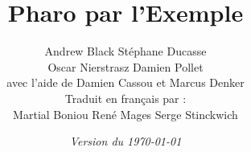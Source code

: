 \documentclass[a4paper,10pt,twoside]{book}
\begin{document}
\frontmatter
\setcounter{page}{1}
\pagestyle{headings}
\author{
	Andrew Black\quad
	St\'ephane Ducasse\\[1ex]
	Oscar Nierstrasz\quad
	Damien Pollet
	\\[4ex]
	avec l'aide de Damien Cassou et Marcus Denker
	\\[4ex]
Traduit en fran\c{c}ais par :\\[2ex]
Martial Boniou\quad
René Mages\quad
Serge Stinckwich\\
	}
\title{\Huge\bf Pharo par l'Exemple}
\numdate
{}
\date{\emph{Version du \today}}
\maketitle
~ %
\vfill
\end{document}
